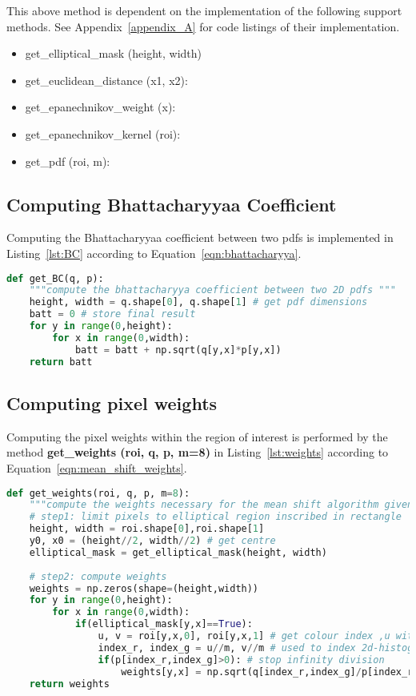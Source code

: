 This above method is dependent on the implementation of the following support
methods. See Appendix~\ref{appendix_A} for code listings of their implementation.
\begin{itemize}
    \item get\_elliptical\_mask (height, width)
    \item get\_euclidean\_distance (x1, x2):
    \item get\_epanechnikov\_weight (x):
    \item get\_epanechnikov\_kernel (roi):
    \item get\_pdf (roi, m):
\end{itemize}

\subsection{Computing Bhattacharyyaa Coefficient}
Computing the Bhattacharyyaa coefficient between two pdfs is implemented in
Listing~\ref{lst:BC} according to Equation~\ref{eqn:bhattacharyya}. 

\begin{lstlisting}[language=Python, caption={Computing Bhattacharyya Coefficient}, captionpos=b, label={lst:BC}]
def get_BC(q, p):
    """compute the bhattacharyya coefficient between two 2D pdfs """
    height, width = q.shape[0], q.shape[1] # get pdf dimensions
    batt = 0 # store final result
    for y in range(0,height):
        for x in range(0,width):
            batt = batt + np.sqrt(q[y,x]*p[y,x])
    return batt
\end{lstlisting}

\subsection{Computing pixel weights}
Computing the pixel weights within the region of interest is performed by the
method \textbf{get\_weights (roi, q, p, m=8)} in Listing~\ref{lst:weights} according to Equation~\ref{eqn:mean_shift_weights}.

\begin{lstlisting}[language=Python, caption={Computing Mean Shift Weights}, captionpos=b, label={lst:weights}]
def get_weights(roi, q, p, m=8):
    """compute the weights necessary for the mean shift algorithm given target and candidate distributions q and p"""
    # step1: limit pixels to elliptical region inscribed in rectangle
    height, width = roi.shape[0],roi.shape[1]
    y0, x0 = (height//2, width//2) # get centre 
    elliptical_mask = get_elliptical_mask(height, width)
    
    # step2: compute weights
    weights = np.zeros(shape=(height,width))
    for y in range(0,height):
        for x in range(0,width): 
            if(elliptical_mask[y,x]==True):  
                u, v = roi[y,x,0], roi[y,x,1] # get colour index ,u with which we can index the histograms
                index_r, index_g = u//m, v//m # used to index 2d-histogram
                if(p[index_r,index_g]>0): # stop infinity division
                    weights[y,x] = np.sqrt(q[index_r,index_g]/p[index_r,index_g]) # compute weights based on equation
    return weights 
\end{lstlisting}

